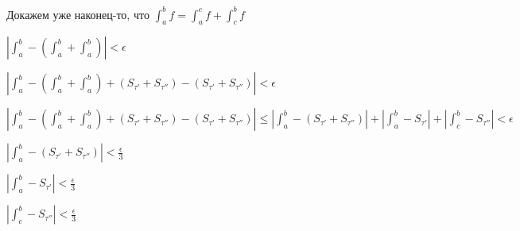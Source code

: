 \documentclass[a4paper]{article}
\begin{document}
\begin{definit}
Докажем уже наконец-то, что $\displaystyle \int_a^b f = \int_a^c f + \int_c^b f $

$\displaystyle \left| \int_a^b - \left( \int_a^b + \int_a^b \right) \right| < \epsilon$

$\displaystyle \left| \int_a^b - \left( \int_a^b + \int_a^b \right) + \left( S_{\tau'} + S_{\tau''} \right) - (S_{\tau'} + S_{\tau''}) \right| < \epsilon$

$\displaystyle \left| \int_a^b - \left( \int_a^b + \int_a^b \right) + \left( S_{\tau'} + S_{\tau''} \right) - (S_{\tau'} + S_{\tau''}) \right| \leq \left| \int_a^b -  (S_{\tau'} + S_{\tau''}) \right| + \left| \int_a^b - S_{\tau'} \right| + \left| \int_c^b - S_{\tau''} \right| <\epsilon$

$\left| \int_a^b - ( S_{\tau'} + S_{\tau''}) \right| < \frac{\epsilon}{3}$

$ \left| \int_a^b - S_{\tau'} \right| < \frac{\epsilon}{3}$

$\left| \int_c^b - S_{\tau''} \right| < \frac{\epsilon}{3}$

\end{definit}
\end{document}
